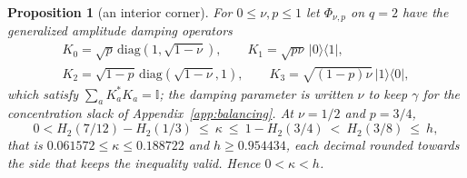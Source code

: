 \documentclass[11pt,a4paper]{article}
\numberwithin{equation}{section}
\theoremstyle{plain}
\newtheorem{proposition}[theorem]{Proposition}
\theoremstyle{definition}
\newcommand{\one}{\mathbb{I}}
\newcommand{\ketbra}[2]{\lvert #1 \rangle\langle #2 \rvert}
\begin{document}
\begin{proposition}[an interior corner]
\label{prop:interior}
For $0\le\nu,p\le 1$ let $\Phi_{\nu,p}$ on $q=2$ have the generalized
amplitude damping operators
\[
\begin{gathered}
K_0=\sqrt{p}\,\mathrm{diag}(1,\sqrt{1-\nu}),\qquad
K_1=\sqrt{p\nu}\,\ketbra{0}{1},\\
K_2=\sqrt{1-p}\,\mathrm{diag}(\sqrt{1-\nu},1),\qquad
K_3=\sqrt{(1-p)\nu}\,\ketbra{1}{0},
\end{gathered}
\]
which satisfy $\sum_a K_a^*K_a=\one$; the damping parameter is written $\nu$
to keep $\gamma$ for the concentration slack of Appendix~\ref{app:balancing}.
At $\nu=1/2$ and $p=3/4$,
\[
0<H_2(7/12)-H_2(1/3)\ \le\ \kappa\ \le\ 1-H_2(3/4)\ <\ H_2(3/8)\ \le\ h,
\]
that is $0.061572\le\kappa\le 0.188722$ and $h\ge 0.954434$, each decimal
rounded towards the side that keeps the inequality valid. Hence
$0<\kappa<h$.
\end{proposition}
\end{document}
